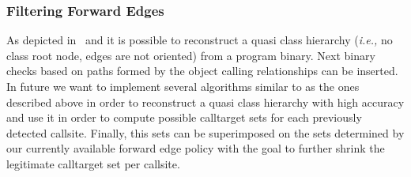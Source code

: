 \subsubsection{Filtering Forward Edges}
As depicted in~\cite{vci:asiaccs} and \cite{marx} it is possible to reconstruct
a quasi class hierarchy (\textit{i.e.,} no class root node, edges are not oriented) from 
a program binary. Next binary checks based on paths formed by the object calling 
relationships can be inserted. 
In future we want to implement several algorithms similar to as the ones described above
in order to reconstruct a quasi class hierarchy with high accuracy and use it in order to compute 
possible calltarget sets for each previously detected callsite. Finally, this sets
can be superimposed on the sets determined by our currently available forward edge policy with the goal
to further shrink the legitimate calltarget set per callsite.
